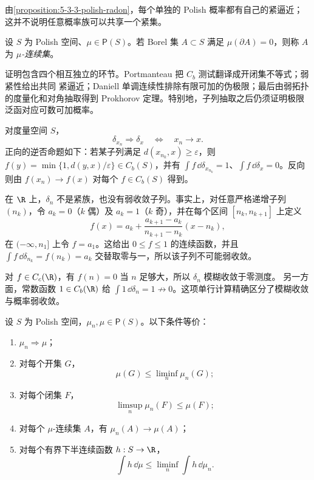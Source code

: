 由\cref{proposition:5-3-3-polish-radon}，每个单独的 Polish 概率都有自己的紧逼近；这并不说明任意概率族可以共享一个紧集。

\begin{definition}[$\mu$-连续集]\label{def:5-3-3-4}
设 $S$ 为 Polish 空间、$\mu\in\mathsf P(S)$。若 Borel 集 $A\subset S$ 满足
$\mu(\partial A)=0$，则称 $A$ 为
\emph{$\mu$-连续集}。
\end{definition}

\begin{remark}\label{rem:5-3-3-four-stations}
证明包含四个相互独立的环节。Portmanteau 把 $C_b$ 测试翻译成开闭集不等式；弱紧性给出共同
紧逼近；Daniell 单调连续性排除有限可加的伪极限；最后由弱拓扑的度量化和对角抽取得到
Prokhorov 定理。特别地，子列抽取之后仍须证明极限泛函对应可数可加概率。
\end{remark}

\begin{example}[移动 Dirac 质量]\label{ex:5-3-3-1}
对度量空间 $S$，
\[
 \delta_{x_n}\Rightarrow\delta_x
 \quad\Longleftrightarrow\quad x_n\to x.
\]
正向的逆否命题如下：若某子列满足 $d(x_{n_k},x)\ge\varepsilon$，则
$f(y)=\min\{1,d(y,x)/\varepsilon\}\in C_b(S)$，并有
$\int f\,\dd\delta_{x_{n_k}}=1$、$\int f\,\dd\delta_x=0$。反向则由
$f(x_n)\to f(x)$ 对每个 $f\in C_b(S)$ 得到。

在 $\R$ 上，$\delta_n$ 不是紧族，也没有弱收敛子列。事实上，对任意严格递增子列
$(n_k)$，令 $a_k=0$（$k$ 偶）及 $a_k=1$（$k$ 奇），并在每个区间
$[n_k,n_{k+1}]$ 上定义
\[
 f(x)=a_k+\frac{a_{k+1}-a_k}{n_{k+1}-n_k}(x-n_k),
\]
在 $(-\infty,n_1]$ 上令 $f=a_1$。这给出 $0\le f\le1$ 的连续函数，并且
$\int f\,\dd\delta_{n_k}=f(n_k)=a_k$ 交替取零与一，所以该子列不可能弱收敛。
\end{example}

\begin{example}[模糊收敛丢失质量]\label{ex:5-3-3-3}
对 $f\in C_c(\R)$，有 $f(n)=0$ 当 $n$ 足够大，所以 $\delta_n$ 模糊收敛于零测度。
另一方面，常数函数 $1\in C_b(\R)$ 给
$\int1\,\dd\delta_n=1\not\to0$。这项单行计算精确区分了模糊收敛与概率弱收敛。
\end{example}

\begin{theorem}[Portmanteau 定理]\label{theorem:5-3-3-1}
设 $S$ 为 Polish 空间，$\mu_n,\mu\in\mathsf P(S)$。以下条件等价：
\begin{enumerate}
  \item $\mu_n\Rightarrow\mu$；
  \item 对每个开集 $G$，
  \[
    \mu(G)\le\liminf_n\mu_n(G);
  \]
  \item 对每个闭集 $F$，
  \[
    \limsup_n\mu_n(F)\le\mu(F);
  \]
  \item 对每个 $\mu$-连续集 $A$，有 $\mu_n(A)\to\mu(A)$；
  \item 对每个有界下半连续函数 $h:S\to\R$，
  \[
    \int h\,\dd\mu\le\liminf_n\int h\,\dd\mu_n.
  \]
\end{enumerate}
\end{theorem}

